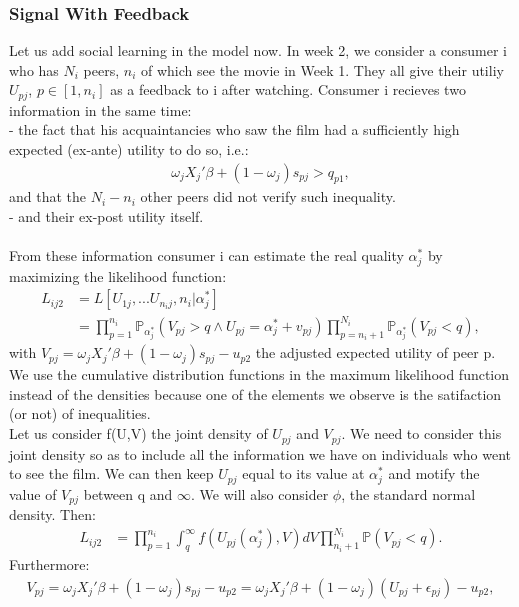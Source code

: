 	\subsubsection{Signal With Feedback}
	Let us add social learning in the model now. In week 2, we consider a consumer i who has $N_{i}$ peers, $n_{i}$ of which see the movie in Week 1. They all give their utiliy $U_{p j }$, $p\in[1,n_{i}]$ as a feedback to i after watching. Consumer i recieves two information in the same time:\\
	- the fact that his acquaintancies who saw the film had a sufficiently high expected (ex-ante) utility to do so, i.e.:
	\begin{align*}
	\omega_{j} X_{j}'\beta+(1-\omega_{j})s_{p j}>q_{p 1},
	\end{align*}
	and that the $N_{i}-n_{i}$ other peers did not verify such inequality.\\
	- and their ex-post utility itself.\\\\
	From these information consumer i can estimate the real quality $\alpha_{j}^{*}$ by maximizing the likelihood function:
	\begin{align*}
		L_{i j 2}&=L[U_{1 j},...U_{n_{i} j}, n_{i}|\alpha_{j}^{*}]\\
		&=\prod_{p=1}^{n_{i}}\mathbb{P}_{\alpha_{j}^{*}}(V_{p j}>q \wedge U_{p j}=\alpha_{j}^{*}+v_{p j})
		\prod_{p=n_{i}+1}^{N_{i}}\mathbb{P}_{\alpha_{j}^{*}}(V_{p j}<q),
	\end{align*}
	with $V_{p j}=\omega_{j} X_{j}'\beta+(1-\omega_{j})s_{p j}-u_{p 2}$ the adjusted expected utility of peer p. We use the cumulative distribution functions in the maximum likelihood function instead of the densities because one of the elements we observe is the satifaction (or not) of inequalities.\\
	Let us consider f(U,V) the joint density of $U_{p j}$ and $V_{p j}$. We need to consider this joint density so as to include all the information we have on individuals who went to see the film. We can then keep $U_{p j}$ equal to its value at $\alpha_{j}^{*}$ and motify the value of $V_{p j}$ between q and $\infty$. We will also consider $\phi$, the standard normal density. Then:
	\begin{align*}
		L_{i j 2}&=\prod_{p=1}^{n_{i}}\int_{q}^{\infty}f(U_{p j}(\alpha_{j}^{*}), V)dV \prod_{n_{i}+1}^{N_{i}}\mathbb{P}(V_{p j}<q).
	\end{align*}	
	Furthermore:
	\begin{align*}
		V_{p j}=\omega_{j} X_{j}'\beta+(1-\omega_{j})s_{p j}-u_{p 2}=\omega_{j} X_{j}'\beta+(1-\omega_{j})(U_{p j}+\epsilon_{p j})-u_{p 2},
	\end{align*}	
